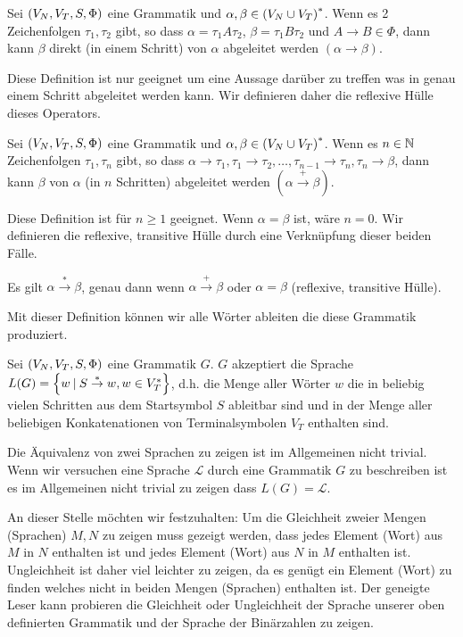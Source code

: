 \begin{defn}
Sei $\left(V_N,V_T,S,\Phi\right)$ eine Grammatik und $\alpha,\beta \in \left(V_N \cup V_T\right)^*$.
Wenn es 2 Zeichenfolgen $\tau_1,\tau_2$ gibt, so dass $\alpha=\tau_1 A \tau_2$, $\beta=\tau_1 B \tau_2$ und $A \to B \in \Phi$,
dann kann $\beta$ direkt (in einem Schritt) von $\alpha$ abgeleitet werden $(\alpha \to \beta)$.
\end{defn}

Diese Definition ist nur geeignet um eine Aussage darüber zu treffen was in genau einem Schritt abgeleitet werden kann. Wir definieren daher die reflexive Hülle dieses Operators.

\begin{defn}
Sei $\left(V_N,V_T,S,\Phi\right)$ eine Grammatik und $\alpha,\beta \in \left(V_N \cup V_T\right)^*$.
Wenn es $n \in \mathbb{N}$ Zeichenfolgen $\tau_1,\tau_n$ gibt, so dass $\alpha \to \tau_1, \tau_1 \to \tau_2 , \ldots , \tau_{n-1} \to \tau_n , \tau_n \to \beta$,
dann kann $\beta$ von $\alpha$ (in $n$ Schritten) abgeleitet werden $(\alpha \overset{+}{\to} \beta)$.
\end{defn}

Diese Definition ist für $n \geq 1$ geeignet. Wenn $\alpha = \beta$ ist, wäre $n=0$. Wir definieren die reflexive, transitive Hülle durch eine Verknüpfung dieser beiden Fälle.

\begin{defn}
Es gilt $\alpha \overset{*}{\to} \beta$, genau dann wenn $\alpha \overset{+}{\to} \beta$ oder $\alpha = \beta$ (reflexive, transitive Hülle).
\end{defn}

Mit dieser Definition können wir alle Wörter ableiten die diese Grammatik produziert.

\begin{defn}
Sei $\left(V_N,V_T,S,\Phi\right)$ eine Grammatik $G$. $G$ akzeptiert die Sprache $L(G)=\left\{w \: | \: S \overset{*}{\to} w, w \in V_T^*\right\}$, d.h. die Menge aller Wörter $w$ die in beliebig
vielen Schritten aus dem Startsymbol $S$ ableitbar sind und in der Menge aller beliebigen Konkatenationen von Terminalsymbolen $V_T$ enthalten sind.
\end{defn}

Die Äquivalenz von zwei Sprachen zu zeigen ist im Allgemeinen nicht trivial. Wenn wir versuchen eine Sprache $\mathcal{L}$ durch eine Grammatik $G$ zu beschreiben
ist es im Allgemeinen nicht trivial zu zeigen dass $L(G)=\mathcal{L}$.

An dieser Stelle möchten wir festzuhalten: Um die Gleichheit zweier Mengen (Sprachen) $M,N$ zu zeigen muss gezeigt werden, dass jedes Element (Wort) aus $M$ in $N$ enthalten ist
und jedes Element (Wort) aus $N$ in $M$ enthalten ist. Ungleichheit ist daher viel leichter zu zeigen, da es genügt ein Element (Wort) zu finden welches nicht in beiden Mengen (Sprachen) enthalten ist. Der geneigte Leser kann probieren die Gleichheit oder Ungleichheit der Sprache unserer oben definierten Grammatik und der Sprache der Binärzahlen zu zeigen.

